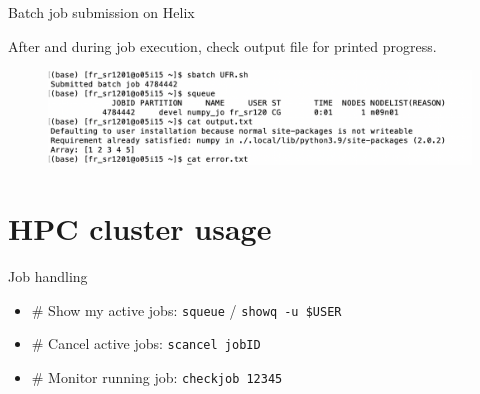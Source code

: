 \documentclass{beamer}
\begin{document}
\begin{frame}{Batch job submission on Helix}

After and during job execution, check output file for printed progress. 

\begin{figure}
    \centering
    \includegraphics[width=1\linewidth]{examples/ScreenShots/S3.png}
\end{figure}

\end{frame}

\section{HPC cluster usage}

\begin{frame}{Job handling}

\begin{itemize}
    \item # Show my active jobs: \texttt{squeue} / \texttt{showq -u \$USER}
    \item # Cancel active jobs: \texttt{scancel jobID}
    \item # Monitor running job: \texttt{checkjob 12345}
\end{itemize}

\end{frame}
\end{document}

